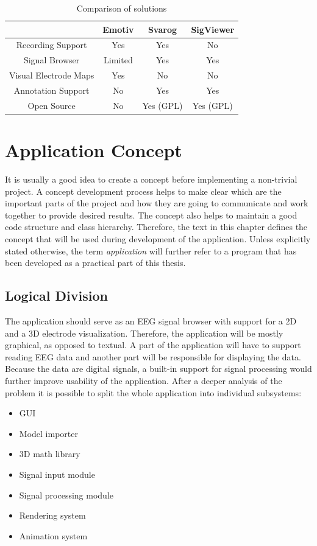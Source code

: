 \begin{table}[htbp]
	\centering
	\begin{tabular}{|c|c|c|c|}
		\hline  & Emotiv & Svarog & SigViewer \\ 
		\hline Recording Support & Yes & Yes & No \\ 
		\hline Signal Browser & Limited & Yes & Yes \\ 
		\hline Visual Electrode Maps & Yes & No & No \\ 
		\hline Annotation Support & No & Yes & Yes \\ 
		\hline Open Source & No & Yes (GPL) & Yes (GPL) \\ 
		\hline 
	\end{tabular} 
	\caption{Comparison of solutions}
	\label{t:comparison}
\end{table}

\chapter{Application Concept} \label{concept}
It is usually a good idea to create a concept before implementing a non-trivial project. A concept development process helps to make clear which are the important parts of the project and how they are going to communicate and work together to provide desired results. The concept also helps to maintain a good code structure and class hierarchy. Therefore, the text in this chapter defines the concept that will be used during development of the application. Unless explicitly stated otherwise, the term \emph{application} will further refer to a program that has been developed as a practical part of this thesis. 

\section{Logical Division}
The application should serve as an EEG signal browser with support for a 2D and a 3D electrode visualization. Therefore, the application will be mostly graphical, as opposed to textual. A part of the application will have to support reading EEG data and another part will be responsible for displaying the data. Because the data are digital signals, a built-in support for signal processing would further improve usability of the application. After a deeper analysis of the problem it is possible to split the whole application into individual subsystems:
\begin{itemize}
	\item GUI
	\item Model importer
	\item 3D math library 
	\item Signal input module
	\item Signal processing module
	\item Rendering system
	\item Animation system
\end{itemize}

